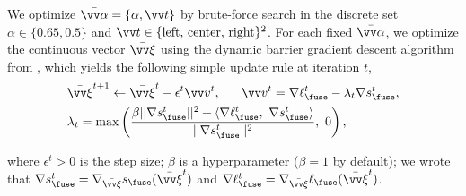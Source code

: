 \documentclass[10pt,twocolumn,letterpaper]{article}
\newcommand{\ourloss}{\texttt{AugCLIP}}
\begin{document}
\iffalse
Intuitively, the above optimization problem tries to find a solution that minimizes the perceptual distance between the foreground image $\mathcal{I}_{fg}$ and the background patch $\mathcal{P}_{bg}$ while keeps the composed image $\mathcal{I}$ on the manifold that maximizes the \ourloss~score with respect to the query text $\mathcal{T}$. 
\fi


\iffalse 
Bi-level optimization problems are known to be hard to solve \cite{solodov2007bundle, sinha2017review}.
Classical approaches either require time-consuming procedure that solves the inner and outer optimization iteratively~\cite{solodov2007bundle, sinha2017review}, or replace the bi-level optimization with a linearized relaxation~\cite{liu2018darts}. 
To efficiently solve the optimization problom~\eqref{eq:bilevel}, we instead adopt a recently-proposed Dynamic Barrier Gradient Descent (DBGD) algorithm~\cite{gong2021biobjective, gong2021automatic}. 
Unlike most of the algorithm for solving bi-level optimization that usually involves an burdensome inner loop and an outer loop, 
DBGD only requires the first-order derivative of the two objectives while still guarantees convergence to the local optimum. DBGD updates $\Phi$ with the following update rule,
\fi 
We optimize $\bar{\vv \alpha} = \{\alpha, \vv t \}$ by brute-force search in the discrete set $\alpha \in\{0.65, 0.5\}$ and $\vv t \in \{\textrm{left, center, right}\}^2$. For each fixed $\bar{\vv\alpha}$, we optimize the continuous vector $\bar{\vv\xi} $ using the dynamic barrier gradient descent algorithm from \cite{gong2021biobjective},  
which yields the following simple update rule at iteration $t$, 
\begin{equation}
\begin{aligned}   
    \label{eq:lexico_update}
    &\bar{\vv\xi}^{t+1} \leftarrow \bar{\vv\xi}^{t} - \epsilon^t \vv v^t,   
    ~~~~~ \vv v^t = \nabla \ell_{\fuse}^t  - \lambda_t \nabla s_{\fuse}^t,
    \\ &\lambda_t = \max  \left (\frac{\beta ||\nabla s_{\fuse}^t||^2 + \langle \nabla \ell_{\fuse}^t,~ \nabla s_{\fuse}^t\rangle }{||\nabla s_{\fuse}^t ||^2},~0 \right ),
\end{aligned}
\end{equation}
\iffalse 
\begin{equation}
\begin{aligned}   
    \label{eq:lexico_update}
    &\bar{\vv\xi}^{t+1} \leftarrow \bar{\vv\xi}^{t} - \epsilon \left (\nabla \ell_{\fuse}(\bar{\vv\xi}^t)  - \lambda_t \nabla s_{\fuse}(\bar{\vv\xi}^t) \right),
    \\ &\lambda_t = \max  \left (\frac{\beta ||\nabla s_{\fuse}(\bar{\vv \xi}^t)||^2 + \nabla \ell_{\text{per}}(\bar{\vv\xi}^t) ^\top \nabla s_{\fuse}(\bar{\vv\xi}^t) }{||\nabla s_{\fuse}(\bar{\vv\xi}^t) ||^2},~0 \right ),
\end{aligned}
\end{equation}
\fi 
where $\epsilon^t >0$ is the step size; $\beta$ is a hyperparameter ($\beta=1$ by default); 
we wrote that
$\nabla s_{\fuse}^t = \nabla_{\bar{\vv\xi}}
    s_{\fuse}(\bar{\vv\xi}^t)$  and 
$\nabla \ell_{\fuse}^t = \nabla_{\bar{\vv\xi}}
    \ell_{\fuse}(\bar{\vv\xi}^t)$. 
    
\end{document}

